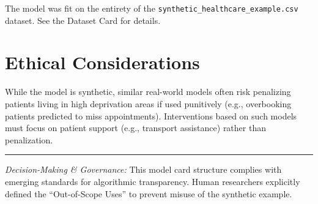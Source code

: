 \documentclass[
]{report}
\begin{document}
The model was fit on the entirety of the
\texttt{synthetic\_healthcare\_example.csv} dataset. See the Dataset
Card for details.

\chapter{Ethical Considerations}\label{ethical-considerations}

While the model is synthetic, similar real-world models often risk
penalizing patients living in high deprivation areas if used punitively
(e.g., overbooking patients predicted to miss appointments).
Interventions based on such models must focus on patient support (e.g.,
transport assistance) rather than penalization.

\begin{center}\rule{0.5\linewidth}{0.5pt}\end{center}

\begin{tcolorbox}[enhanced jigsaw, arc=.35mm, leftrule=.75mm, left=2mm, colframe=quarto-callout-note-color-frame, toprule=.15mm, breakable, titlerule=0mm, title=\textcolor{quarto-callout-note-color}{\faInfo}\hspace{0.5em}{AI Capability Checkpoint}, bottomrule=.15mm, bottomtitle=1mm, colbacktitle=quarto-callout-note-color!10!white, coltitle=black, colback=white, opacityback=0, toptitle=1mm, rightrule=.15mm, opacitybacktitle=0.6]

\emph{Decision-Making \& Governance:} This model card structure complies
with emerging standards for algorithmic transparency. Human researchers
explicitly defined the ``Out-of-Scope Uses'' to prevent misuse of the
synthetic example.

\end{tcolorbox}
\end{document}
